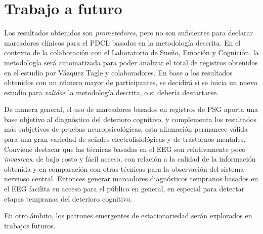 \documentclass[12pt,letterpaper,draft]{book}
\begin{document}
\section{Trabajo a futuro}

Los resultados obtenidos son \textit{prometedores}, pero no son suficientes para declarar marcadores clínicos para el PDCL basados en la metodología descrita.
%
En el contexto de la colaboración con el Laboratorio de Sueño, Emoción y Cognición, la metodología será automatizada para poder analizar el total de registros obtenidos en el estudio por Vázquez Tagle y colaboradores.
%
En base a los resultados obtenidos con un número mayor de participantes, se decidirá si se inicia un nuevo estudio para \textit{validar} la metodología descrita, o si debería descartarse.

%
%

De manera general, el uso de marcadores basados en registros de PSG aporta una base objetivo al diagnóstico del deterioro cognitivo, y complementa los resultados más subjetivos de pruebas neuropsicológicas; esta afirmación permanece válida para una gran variedad de señales electrofisiológicas y de trastornos mentales.
%
Conviene destacar que las técnicas basadas en el EEG son relativamente poco \textit{invasivas}, de bajo costo y fácil acceso, con relación a la calidad de la información obtenida y en comparación con otras técnicas para la observación del sistema nervioso central.
%
Entonces generar marcadores diagnósticos tempranos basados en el EEG facilita su acceso para el público en general, en especial para detectar etapas tempranas del deterioro cognitivo.

En otro ámbito, los patrones emergentes de estacionariedad serán explorados en trabajos futuros.

\end{document}
